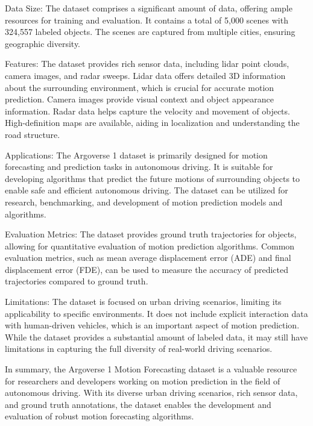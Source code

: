 Data Size:
The dataset comprises a significant amount of data, offering ample resources for training and evaluation.
It contains a total of 5,000 scenes with 324,557 labeled objects.
The scenes are captured from multiple cities, ensuring geographic diversity.

Features:
The dataset provides rich sensor data, including lidar point clouds, camera images, and radar sweeps.
Lidar data offers detailed 3D information about the surrounding environment, which is crucial for accurate motion prediction.
Camera images provide visual context and object appearance information.
Radar data helps capture the velocity and movement of objects.
High-definition maps are available, aiding in localization and understanding the road structure.

Applications:
The Argoverse 1 dataset is primarily designed for motion forecasting and prediction tasks in autonomous driving.
It is suitable for developing algorithms that predict the future motions of surrounding objects to enable safe and efficient autonomous driving.
The dataset can be utilized for research, benchmarking, and development of motion prediction models and algorithms.

Evaluation Metrics:
The dataset provides ground truth trajectories for objects, allowing for quantitative evaluation of motion prediction algorithms.
Common evaluation metrics, such as mean average displacement error (ADE) and final displacement error (FDE), can be used to measure the accuracy of predicted trajectories compared to ground truth.

Limitations:
The dataset is focused on urban driving scenarios, limiting its applicability to specific environments.
It does not include explicit interaction data with human-driven vehicles, which is an important aspect of motion prediction.
While the dataset provides a substantial amount of labeled data, it may still have limitations in capturing the full diversity of real-world driving scenarios.

In summary, the Argoverse 1 Motion Forecasting dataset is a valuable resource for researchers and developers working on motion prediction in the field of autonomous driving. With its diverse urban driving scenarios, rich sensor data, and ground truth annotations, the dataset enables the development and evaluation of robust motion forecasting algorithms.

